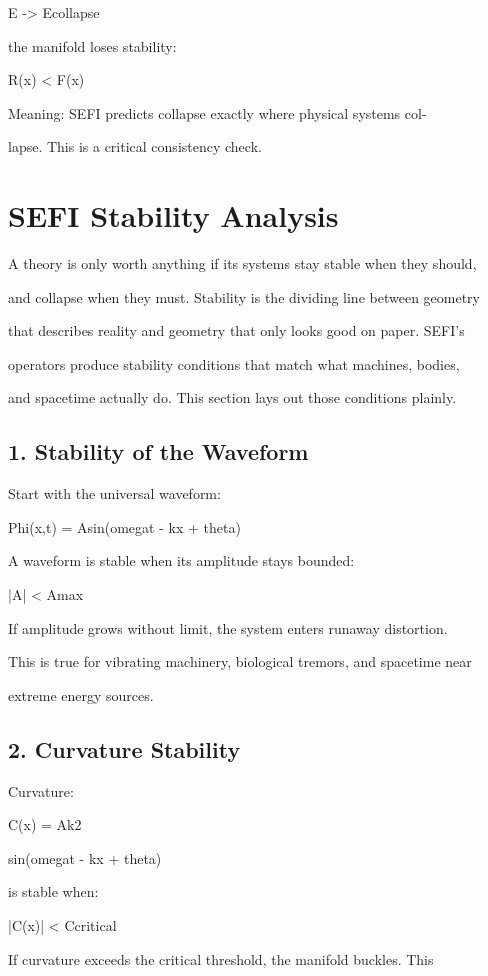 \documentclass[10pt]{article}
\begin{document}
E -> Ecollapse

the manifold loses stability:

R(x) < F(x)

Meaning: SEFI predicts collapse exactly where physical systems col-

lapse. This is a critical consistency check.


\section*{SEFI Stability Analysis}
A theory is only worth anything if its systems stay stable when they should,

and collapse when they must. Stability is the dividing line between geometry

that describes reality and geometry that only looks good on paper. SEFI's

operators produce stability conditions that match what machines, bodies,

and spacetime actually do. This section lays out those conditions plainly.

\subsection*{1. Stability of the Waveform}
Start with the universal waveform:

Phi(x,t) = Asin(omegat - kx + theta)

A waveform is stable when its amplitude stays bounded:

|A| < Amax

If amplitude grows without limit, the system enters runaway distortion.

This is true for vibrating machinery, biological tremors, and spacetime near

extreme energy sources.

\subsection*{2. Curvature Stability}
Curvature:

C(x) = Ak2

sin(omegat - kx + theta)

is stable when:

|C(x)| < Ccritical

If curvature exceeds the critical threshold, the manifold buckles. This
\end{document}

